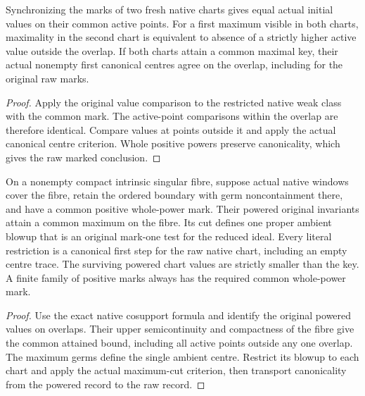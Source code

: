 \begin{theorem}
\label{hir:g8-fresh-native-first-centre-overlap}
\leanok
Synchronizing the marks of two fresh native charts gives equal
actual initial values on their common active points. For a first
maximum visible in both charts, maximality in the second chart
is equivalent to absence of a strictly higher active value outside
the overlap. If both charts attain a common maximal key,
their actual nonempty first canonical centres agree on the
overlap, including for the original raw marks.
\end{theorem}
\begin{proof}
Apply the original value comparison to the restricted native
weak class with the common mark. The active-point comparisons
within the overlap are therefore identical. Compare values at
points outside it and apply the actual canonical centre criterion.
Whole positive powers preserve canonicality, which gives the
raw marked conclusion.
\end{proof}

\begin{theorem}
\label{hir:g8-fresh-native-compact-first-cut}
\leanok
On a nonempty compact intrinsic singular fibre, suppose actual native
windows cover the fibre, retain the ordered boundary with germ
noncontainment there, and have a common positive whole-power mark.
Their powered original invariants attain a common maximum on the
fibre. Its cut defines one proper ambient blowup that is an original
mark-one test for the reduced ideal. Every literal restriction is a
canonical first step for the raw native chart, including an empty
centre trace. The surviving powered chart values are strictly smaller
than the key. A finite family of positive marks always has the
required common whole-power mark.
\end{theorem}
\begin{proof}
Use the exact native cosupport formula and identify the original
powered values on overlaps. Their upper semicontinuity and compactness
of the fibre give the common attained bound, including all active
points outside any one overlap. The maximum germs define the single
ambient centre. Restrict its blowup to each chart and apply the actual
maximum-cut criterion, then transport canonicality from the powered
record to the raw record.
\end{proof}

